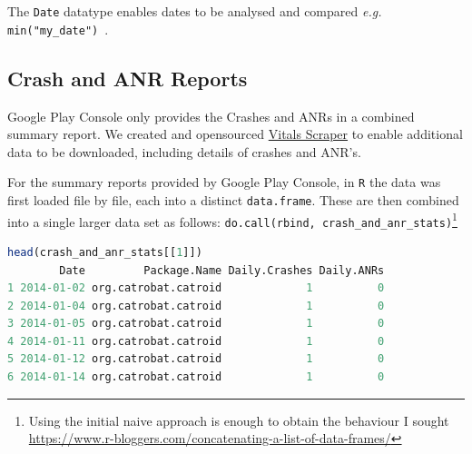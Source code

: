 The \texttt{Date} datatype enables dates to be analysed and compared \emph{e.g.} \texttt{min("my\_date")}~\cite{r_bloggers_date_formats_in_r}.


\subsection{Crash and ANR Reports}
Google Play Console only provides the Crashes and ANRs in a combined summary report. We created and opensourced \href{https://github.com/commercetest/vitals-scraper}{Vitals Scraper} to enable additional data to be downloaded, including details of crashes and ANR's.

For the summary reports provided by Google Play Console, in \texttt{R} the data was first loaded file by file, each into a distinct \texttt{data.frame}. These are then combined into a single larger data set as follows:  
\texttt{do.call(rbind, crash\_and\_anr\_stats)}\footnote{Using the initial naive approach is enough to obtain the behaviour I sought \url{https://www.r-bloggers.com/concatenating-a-list-of-data-frames/}}

\begin{lstlisting}[language=R, caption=Querying daily crash and ANR statistics files using R, label=listing=using-head-for-crashes-and-anrs-in-r]
head(crash_and_anr_stats[[1]])
        Date         Package.Name Daily.Crashes Daily.ANRs
1 2014-01-02 org.catrobat.catroid             1          0
2 2014-01-04 org.catrobat.catroid             1          0
3 2014-01-05 org.catrobat.catroid             1          0
4 2014-01-11 org.catrobat.catroid             1          0
5 2014-01-12 org.catrobat.catroid             1          0
6 2014-01-14 org.catrobat.catroid             1          0
\end{lstlisting}

